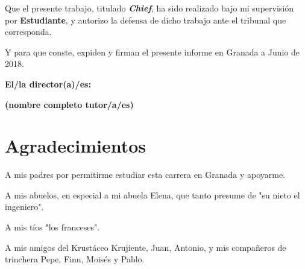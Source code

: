 \vspace{0.5cm}

Que el presente trabajo, titulado \textit{\textbf{Chief}},
ha sido realizado bajo mi supervisión por \textbf{Estudiante}, y autorizo la defensa de dicho trabajo ante el tribunal
que corresponda.

\vspace{0.5cm}

Y para que conste, expiden y firman el presente informe en Granada a Junio de 2018.

\vspace{1cm}

\textbf{El/la director(a)/es: }

\vspace{5cm}

\noindent \textbf{(nombre completo tutor/a/es)}

\chapter*{Agradecimientos}

A mis padres por permitirme estudiar esta carrera en Granada y apoyarme.

A mis abuelos, en especial a mi abuela Elena, que tanto presume de "su nieto el ingeniero".

A mis tíos "los franceses".

A mis amigos del Krustáceo Krujiente, Juan, Antonio, y mis compañeros de trinchera Pepe, Finn, Moisés y Pablo.



